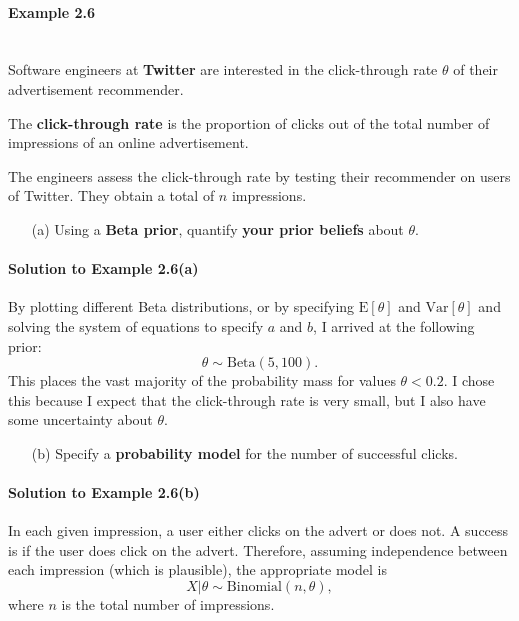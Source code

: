 \paragraph{Example 2.6}{~\\
Software engineers at \textbf{\color{darkblue}Twitter} are interested in the click-through rate $\theta$ of their advertisement recommender.

The \textbf{\color{darkblue}click-through rate} is the proportion of clicks out of the total number of impressions of an online advertisement.

The engineers assess the click-through rate by testing their recommender on users of Twitter. They obtain a total of $n$ impressions.

\begin{itemize}
\item [(a)] Using a \textbf{\color{darkblue}Beta prior}, quantify \textbf{\color{darkblue}your prior beliefs} about $\theta$.
\end{itemize}

\paragraph{Solution to Example 2.6(a)}{
    
    By plotting different Beta distributions, or by specifying $\text{E}[\theta]$ and $\text{Var}[\theta]$ and solving the system of equations to specify $a$ and $b$, I arrived at the following prior:
    $$ \theta \sim \text{Beta}(5, 100). $$
    This places the vast majority of the probability mass for values $\theta < 0.2$. I chose this because I expect that the click-through rate is very small, but I also have some uncertainty about $\theta$.
    
    
}

\begin{itemize}
\item [(b)] Specify a \textbf{\color{darkblue}probability model} for the number of successful clicks.
\end{itemize}
\paragraph{Solution to Example 2.6(b)}{
    
    In each given impression, a user either clicks on the advert or does not. A success is if the user does click on the advert. Therefore, assuming independence between each impression (which is plausible), the appropriate model is
    $$ X|\theta \sim \text{Binomial}(n, \theta), $$
    where $n$ is the total number of impressions.
    
}}
